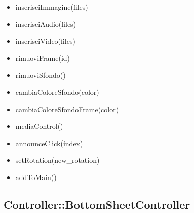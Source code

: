 {{\begin{itemize}
					\item inserisciImmagine(files)
					\item inserisciAudio(files)
					\item inserisciVideo(files)
					\item rimuoviFrame(id)
					\item rimuoviSfondo()
					\item cambiaColoreSfondo(color)
					\item cambiaColoreSfondoFrame(color)
					\item mediaControl()
					\item announceClick(index)
					\item setRotation(new_rotation)
					\item addToMain()
					\end{itemize}
				}
				\subsection{Controller::BottomSheetController}
				}